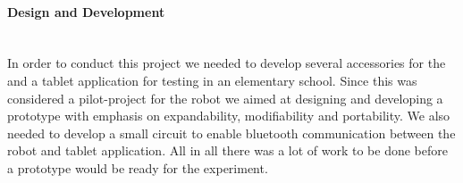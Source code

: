 
\paragraph{Design and Development}~\\
In order to conduct this project we needed to develop several accessories for the \chirp and a tablet application for testing in an elementary school. 
Since this was considered a pilot-project for the \chirp robot we aimed at designing and developing a prototype with emphasis on expandability, modifiability and portability. 
We also needed to develop a small circuit to enable bluetooth communication between the robot and tablet application. 
All in all there was a lot of work to be done before a prototype would be ready for the experiment. 



